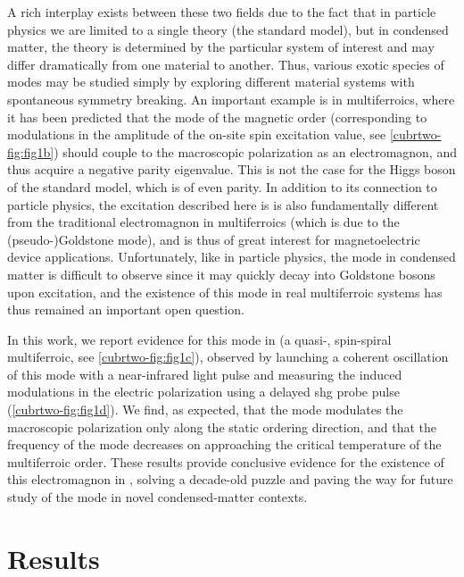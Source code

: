 A rich interplay exists between these two fields due to the fact that in particle physics we are limited to a single theory (the standard model), but in condensed matter, the theory is determined by the particular system of interest and may differ dramatically from one material to another.
Thus, various exotic species of \higgs modes may be studied simply by exploring different material systems with spontaneous symmetry breaking.
An important example is in multiferroics, where it has been predicted\citep{matsumoto_electromagnon_2014,matsumoto_electromagnon_2015} that the \higgs mode of the magnetic order (corresponding to modulations in the amplitude of the on-site spin excitation value, see \cref{cubrtwo-fig:fig1b}) should couple to the macroscopic polarization as an electromagnon, and thus acquire a negative parity eigenvalue.
This is not the case for the Higgs boson of the standard model, which is of even parity\citep{atlas_collaboration_determination_2015}.
In addition to its connection to particle physics, the excitation described here is is also fundamentally different from the traditional electromagnon in multiferroics (which is due to the (pseudo-)Goldstone mode\citep{katsura_dynamical_2007}), and is thus of great interest for magnetoelectric device applications.
Unfortunately, like in particle physics, the \higgs mode in condensed matter is difficult to observe since it may quickly decay into Goldstone bosons upon excitation\cite{jain_higgs_2017}, and the existence of this mode in real multiferroic systems has thus remained an important open question.

In this work, we report evidence for this mode in  (a quasi-\oned, spin-spiral multiferroic, see \cref{cubrtwo-fig:fig1c}), observed by launching a coherent oscillation of this mode with a near-infrared light pulse and measuring the induced modulations in the electric polarization using a delayed \gls{shg} probe pulse (\cref{cubrtwo-fig:fig1d}).
We find, as expected, that the mode modulates the macroscopic polarization only along the static ordering direction, and that the frequency of the mode decreases on approaching the critical temperature of the multiferroic order.
These results provide conclusive evidence for the existence of this electromagnon in , solving a decade-old puzzle and paving the way for future study of the \higgs mode in novel condensed-matter contexts.

\section{Results}
